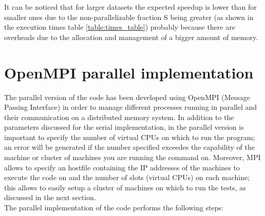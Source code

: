 \documentclass[final,5p,times,twocolumn,authoryear]{elsarticle}
\begin{document}
It can be noticed that for larger datasets the expected speedup is lower than for smaller ones due to the non-parallelizable fraction S being greater (as shown in the execution times table \ref{table:times_table}) probably because there are overheads due to the allocation and management of a bigger amount of memory.

\section{OpenMPI parallel implementation}
The parallel version of the code\cite{parallel me} has been developed using OpenMPI (Message Passing Interface) in order to manage different processes running in parallel and their communication on a distributed memory system. In addition to the parameters discussed for the serial implementation, in the parallel version is important to specify the number of virtual CPUs on which to run the program; an error will be generated if the number specified exceedes the capability of the machine or cluster of machines you are running the command on. Moreover, MPI allows to specify an hostfile containing the IP addresses of the machines to execute the code on and the number of slots (virtual CPUs) on each machine; this allows to easily setup a cluster of machines on which to run the tests, as discussed in the next section. \\
The parallel implementation of the code performs the following steps:
\end{document}
